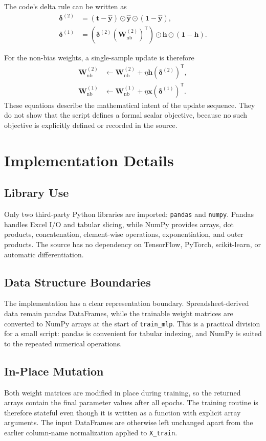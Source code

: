 \documentclass[11pt,a4paper]{article}
\newcommand{\code}[1]{\texttt{\small #1}}
\begin{document}
The code's delta rule can be written as
\begin{align}
\boldsymbol{\delta}^{(2)}
&=(\mathbf{t}-\hat{\mathbf{y}})\odot\hat{\mathbf{y}}\odot(\mathbf{1}-\hat{\mathbf{y}}),\\
\boldsymbol{\delta}^{(1)}
&=\left(\boldsymbol{\delta}^{(2)}(\mathbf{W}^{(2)}_{\mathrm{nb}})^{\mathsf T}\right)
\odot\mathbf{h}\odot(\mathbf{1}-\mathbf{h}).
\end{align}

For the non-bias weights, a single-sample update is therefore
\begin{align}
\mathbf{W}^{(2)}_{\mathrm{nb}} &\leftarrow \mathbf{W}^{(2)}_{\mathrm{nb}}+\eta\mathbf{h}(\boldsymbol{\delta}^{(2)})^{\mathsf T},\\
\mathbf{W}^{(1)}_{\mathrm{nb}} &\leftarrow \mathbf{W}^{(1)}_{\mathrm{nb}}+\eta\mathbf{x}(\boldsymbol{\delta}^{(1)})^{\mathsf T}.
\end{align}
These equations describe the mathematical intent of the update sequence. They do not show that the script defines a formal scalar objective, because no such objective is explicitly defined or recorded in the source.

\section{Implementation Details}
\subsection{Library Use}
Only two third-party Python libraries are imported: \code{pandas} and \code{numpy}. Pandas handles Excel I/O and tabular slicing, while NumPy provides arrays, dot products, concatenation, element-wise operations, exponentiation, and outer products. The source has no dependency on TensorFlow, PyTorch, scikit-learn, or automatic differentiation.

\subsection{Data Structure Boundaries}
The implementation has a clear representation boundary. Spreadsheet-derived data remain pandas DataFrames, while the trainable weight matrices are converted to NumPy arrays at the start of \code{train\_mlp}. This is a practical division for a small script: pandas is convenient for tabular indexing, and NumPy is suited to the repeated numerical operations.

\subsection{In-Place Mutation}
Both weight matrices are modified in place during training, so the returned arrays contain the final parameter values after all epochs. The training routine is therefore stateful even though it is written as a function with explicit array arguments. The input DataFrames are otherwise left unchanged apart from the earlier column-name normalization applied to \code{X\_train}.
\end{document}
